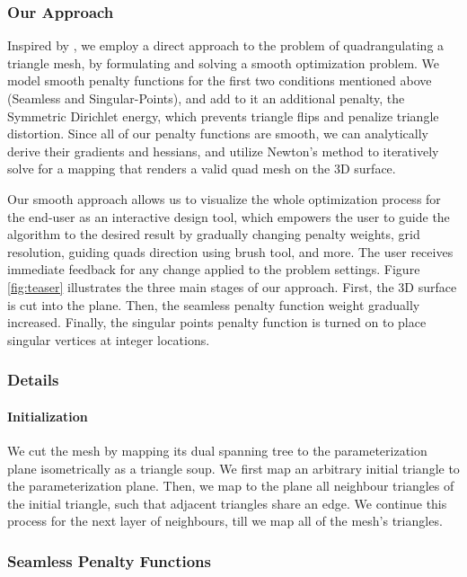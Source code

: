 \subsubsection{Our Approach}
Inspired by \cite{Poranne:Autocuts:2017}, we employ a direct approach to the problem of quadrangulating a triangle mesh, by formulating and solving a smooth optimization problem. We model smooth penalty functions for the first two conditions mentioned above (Seamless and Singular-Points), and add to it an additional penalty, the Symmetric Dirichlet energy, which prevents triangle flips and penalize triangle distortion.
Since all of our penalty functions are smooth, we can analytically derive their gradients and hessians, and utilize Newton's method to iteratively solve for a mapping that renders a valid quad mesh on the 3D surface.

\noindent Our smooth approach allows us to visualize the whole optimization process for the end-user as an interactive design tool, which empowers the user to guide the algorithm to the desired result by gradually changing penalty weights, grid resolution, guiding quads direction using brush tool, and more. The user receives immediate feedback for any change applied to the problem settings. Figure \ref{fig:teaser} illustrates the three main stages of our approach. First, the 3D surface is cut into the plane. Then, the seamless penalty function weight gradually increased. Finally, the singular points penalty function is turned on to place singular vertices at integer locations.

\subsubsection{Details}
\paragraph{Initialization}
We cut the mesh by mapping its dual spanning tree to the parameterization plane isometrically as a triangle soup. We first map an arbitrary initial triangle to the parameterization plane. Then, we map to the plane all neighbour triangles of the initial triangle, such that adjacent triangles share an edge. We continue this process for the next layer of neighbours, till we map all of the mesh's triangles.
\subsubsection{Seamless Penalty Functions}
